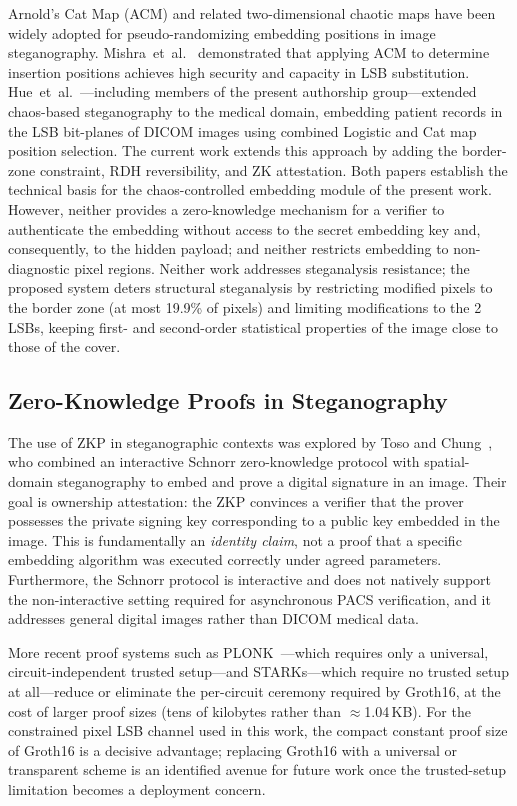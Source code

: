 \documentclass{jstarticle}
\begin{document}
Arnold's Cat Map (ACM) and related two-dimensional chaotic maps have been widely adopted for pseudo-randomizing embedding positions in image steganography.
Mishra~et~al.~\cite{b3} demonstrated that applying ACM to determine insertion positions achieves high security and capacity in LSB substitution.
Hue~et~al.~\cite{b4}---including members of the present authorship group---extended chaos-based steganography to the medical domain, embedding patient records in the LSB bit-planes of DICOM images using combined Logistic and Cat map position selection. The current work extends this approach by adding the border-zone constraint, RDH reversibility, and ZK attestation.
Both papers establish the technical basis for the chaos-controlled embedding module of the present work.
However, neither provides a zero-knowledge mechanism for a verifier to authenticate the embedding without access to the secret embedding key and, consequently, to the hidden payload; and neither restricts embedding to non-diagnostic pixel regions.
Neither work addresses steganalysis resistance; the proposed system deters structural steganalysis by restricting modified pixels to the border zone (at most 19.9\% of pixels) and limiting modifications to the 2 LSBs, keeping first- and second-order statistical properties of the image close to those of the cover.

\subsection{Zero-Knowledge Proofs in Steganography}

The use of ZKP in steganographic contexts was explored by Toso and Chung~\cite{b6}, who combined an interactive Schnorr zero-knowledge protocol with spatial-domain steganography to embed and prove a digital signature in an image.
Their goal is ownership attestation: the ZKP convinces a verifier that the prover possesses the private signing key corresponding to a public key embedded in the image.
This is fundamentally an \emph{identity claim}, not a proof that a specific embedding algorithm was executed correctly under agreed parameters.
Furthermore, the Schnorr protocol is interactive and does not natively support the non-interactive setting required for asynchronous PACS verification, and it addresses general digital images rather than DICOM medical data.

More recent proof systems such as PLONK~\cite{b9}---which requires only a universal, circuit-independent trusted setup---and STARKs---which require no trusted setup at all---reduce or eliminate the per-circuit ceremony required by Groth16, at the cost of larger proof sizes (tens of kilobytes rather than $\approx$1.04\,KB).
For the constrained pixel LSB channel used in this work, the compact constant proof size of Groth16 is a decisive advantage; replacing Groth16 with a universal or transparent scheme is an identified avenue for future work once the trusted-setup limitation becomes a deployment concern.
\end{document}
